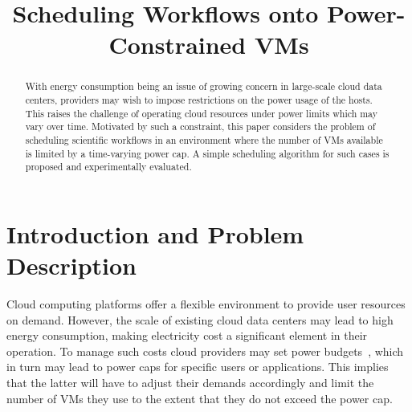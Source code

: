 \documentclass[10pt, conference, compsocconf]{IEEEtran} %
\begin{document}
\title{Scheduling Workflows onto Power-Constrained VMs}
\author{
}

\maketitle

\begin{abstract}
With energy consumption being an issue of growing concern in large-scale cloud data centers, providers may wish to impose restrictions on the power usage of the hosts.
This raises the challenge of operating cloud resources under power limits which may vary over time.
Motivated by such a constraint, this paper considers the problem of scheduling scientific workflows in an environment where the number of VMs available is limited by a time-varying power cap.
A simple scheduling algorithm for such cases is proposed and experimentally evaluated.
\end{abstract}

\section{Introduction and Problem Description} %
\label{sec:intr-probl-descr}

Cloud computing platforms offer a flexible environment to provide user resources on demand.
However, the scale of existing cloud data centers may lead to high energy consumption, making electricity cost a significant element in their operation.
To manage such costs cloud providers may set power budgets~\cite{zhang2011capping}, which in turn may lead to power caps for specific users or applications.
This implies that the latter will have to adjust their demands accordingly and limit the number of VMs they use to the extent that they do not exceed the power cap.
\end{document}
